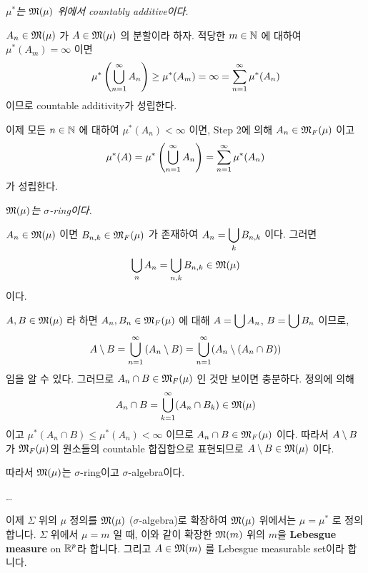  \textit{\(\mu^\ast\)는 \(\mathfrak{M}(\mu)\) 위에서 countably additive이다.}

\(A_n \in \mathfrak{M}(\mu)\) 가 \(A \in \mathfrak{M}(\mu)\) 의 분할이라 하자. 적당한 \(m \in \mathbb{N}\) 에 대하여 \(\mu^\ast(A_m) = \infty\) 이면
\[
    \mu^\ast\left( \bigcup_{n=1}^\infty A_n \right) \geq \mu^\ast(A_m) = \infty = \sum_{n=1}^\infty \mu^\ast(A_n)
\]
이므로 countable additivity가 성립한다.

이제 모든 \(n\in \mathbb{N}\) 에 대하여 \(\mu^\ast(A_n) < \infty\) 이면, {\sffamily Step 2}에 의해 \(A_n \in \mathfrak{M}_F(\mu)\) 이고
\[
    \mu^\ast(A) = \mu^\ast\left( \bigcup_{n=1}^\infty A_n \right) = \sum_{n=1}^\infty \mu^\ast(A_n)
\]
가 성립한다.

 \textit{\(\mathfrak{M}(\mu)\)는 \(\sigma\)-ring이다.}

\(A_n \in \mathfrak{M}(\mu)\) 이면 \(B_{n, k} \in \mathfrak{M}_F(\mu)\) 가 존재하여 \(\displaystyle A_n = \bigcup_k B_{n,k}\) 이다. 그러면
\[
    \bigcup_n A_n = \bigcup_{n, k} B_{n, k} \in \mathfrak{M}(\mu)
\]
이다.

\(A, B \in \mathfrak{M}(\mu)\) 라 하면 \(A_n, B_n \in \mathfrak{M}_F(\mu)\) 에 대해 \(\displaystyle A = \bigcup A_n\), \(\displaystyle B = \bigcup B_n\) 이므로,
\[
    A \setminus B = \bigcup_{n=1}^\infty \left( A_n \setminus B \right) = \bigcup_{n=1}^\infty (A_n\setminus(A_n\cap B))
\]
임을 알 수 있다. 그러므로 \(A_n \cap B \in \mathfrak{M}_F(\mu)\) 인 것만 보이면 충분하다. 정의에 의해
\[
    A_n \cap B = \bigcup_{k=1}^\infty (A_n \cap B_k) \in \mathfrak{M}(\mu)
\]
이고 \(\mu^\ast(A_n \cap B) \leq \mu^\ast(A_n) < \infty\) 이므로 \(A_n\cap B \in \mathfrak{M}_F(\mu)\) 이다. 따라서 \(A \setminus B\) 가 \(\mathfrak{M}_F(\mu)\)의 원소들의 countable 합집합으로 표현되므로 \(A\setminus B \in \mathfrak{M}(\mu)\) 이다.

따라서 \(\mathfrak{M}(\mu)\)는 \(\sigma\)-ring이고 \(\sigma\)-algebra이다.

\dots

이제 \(\Sigma\) 위의 \(\mu\) 정의를 \(\mathfrak{M}(\mu)\) (\(\sigma\)-algebra)로 확장하여 \(\mathfrak{M}(\mu)\) 위에서는 \(\mu = \mu^\ast\) 로 정의합니다. \(\Sigma\) 위에서 \(\mu = m\) 일 때, 이와 같이 확장한 \(\mathfrak{M}(m)\) 위의 \(m\)을 \textbf{Lebesgue measure} on \(\mathbb{R}^p\)라 합니다. 그리고 \(A \in \mathfrak{M}(m)\) 를 Lebesgue measurable set이라 합니다.

\pagebreak
